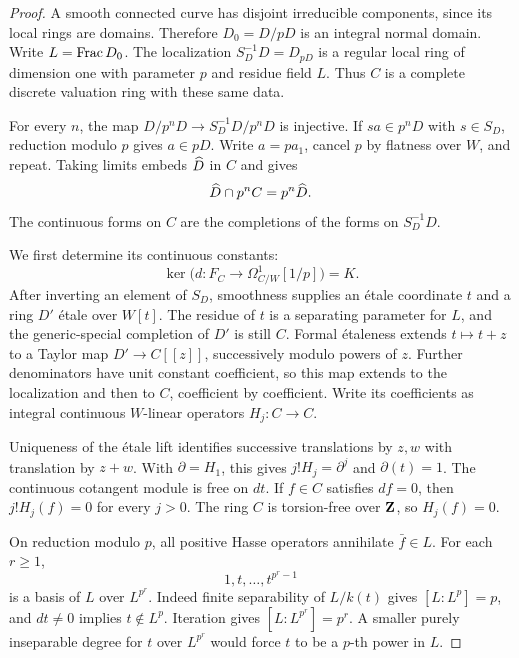 \begin{proof}
A smooth connected curve has disjoint irreducible components, since
its local rings are domains. Therefore \(D_0=D/pD\) is an integral
normal domain. Write \(L=\operatorname{Frac} D_0\).
The localization \(S_D^{-1}D=D_{pD}\) is a regular local ring of
dimension one with parameter \(p\) and residue field \(L\).
Thus \(C\) is a complete discrete valuation ring with these same
data.

For every \(n\), the map
\(D/p^nD\to S_D^{-1}D/p^nD\) is injective.
If \(sa\in p^nD\) with \(s\in S_D\), reduction modulo \(p\) gives
\(a\in pD\). Write \(a=pa_1\), cancel \(p\) by flatness over \(W\),
and repeat.
Taking limits embeds \(\widehat D\) in \(C\) and gives
\begin{equation}\label{d2:eq:integral-intersection}
 \widehat D\cap p^nC=p^n\widehat D.
\end{equation}
The continuous forms on \(C\) are the completions of the forms on
\(S_D^{-1}D\).

We first determine its continuous constants:
\begin{equation}\label{d2:eq:cohen-constants}
 \ker\bigl(d\colon F_C\to\Omega^1_{C/W}[1/p]\bigr)=K.
\end{equation}
After inverting an element of \(S_D\), smoothness supplies an
\'etale coordinate \(t\) and a ring \(D'\) \'etale over \(W[t]\).
The residue of \(t\) is a separating parameter for \(L\), and the
generic-special completion of \(D'\) is still \(C\).
Formal \'etaleness extends \(t\mapsto t+z\) to a Taylor map
\(D'\to C[[z]]\), successively modulo powers of \(z\).
Further denominators have unit constant coefficient, so this map
extends to the localization and then to \(C\), coefficient by
coefficient.
Write its coefficients as integral continuous \(W\)-linear operators
\(H_j\colon C\to C\).

Uniqueness of the \'etale lift identifies successive translations by
\(z,w\) with translation by \(z+w\).
With \(\partial=H_1\), this gives
\(j!H_j=\partial^j\) and \(\partial(t)=1\).
The continuous cotangent module is free on \(dt\).
If \(f\in C\) satisfies \(df=0\), then
\(j!H_j(f)=0\) for every \(j>0\).
The ring \(C\) is torsion-free over \(\mathbf{Z}\), so \(H_j(f)=0\).

On reduction modulo \(p\), all positive Hasse operators annihilate
\(\bar f\in L\).
For each \(r\ge1\),
\[
 1,t,\ldots,t^{p^r-1}
\]
is a basis of \(L\) over \(L^{p^r}\).
Indeed finite separability of \(L/k(t)\) gives
\([L:L^p]=p\), and \(dt\ne0\) implies \(t\notin L^p\).
Iteration gives \([L:L^{p^r}]=p^r\).
A smaller purely inseparable degree for \(t\) over \(L^{p^r}\)
would force \(t\) to be a \(p\)-th power in \(L\).


\end{proof}
